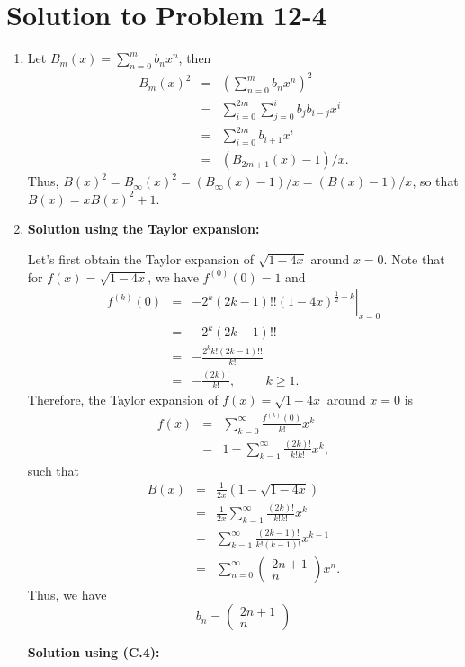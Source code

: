 \documentclass[a4paper, fleqn]{article}
\begin{document}
\section*{Solution to Problem 12-4}
\begin{enumerate}
\renewcommand{\labelenumi}{\itshape \bfseries \alph{enumi}.}

\item  %
Let $B_m(x) = \sum_{n=0}^mb_nx^n$, then
\begin{eqnarray*}
B_m(x)^2 & = & \left(\sum_{n=0}^mb_nx^n\right)^2 \\
        & = & \sum_{i=0}^{2m}\sum_{j=0}^ib_jb_{i-j}x^i \\
        & = & \sum_{i=0}^{2m}b_{i+1}x^i \\
        & = & (B_{2m+1}(x)-1)/x.
\end{eqnarray*}
Thus, $B(x)^2 = B_\infty(x)^2 = (B_\infty(x)-1)/x = (B(x)-1)/x$, so
that $B(x) = xB(x)^2+1$.

\item  %
\textbf{Solution using the Taylor expansion:}

Let's first obtain the Taylor expansion of $\sqrt{1-4x}$ around $x =
0$. Note that for $f(x) = \sqrt{1-4x}$, we have $f^{(0)}(0) = 1$ and
\begin{eqnarray*}
f^{(k)}(0) & = &
\left.-2^{k}(2k-1)!!(1-4x)^{\frac{1}{2}-k}\right|_{x=0} \\
& = & -2^{k}(2k-1)!! \\
& = & -\frac{2^kk!(2k-1)!!}{k!} \\
& = & -\frac{(2k)!}{k!}, \hspace{1cm} k \geq 1.
\end{eqnarray*}
Therefore, the Taylor expansion of $f(x) = \sqrt{1-4x}$ around $x = 0$
is
\begin{eqnarray*}
f(x) & = & \sum_{k=0}^\infty \frac{f^{(k)}(0)}{k!} x^k \\
     & = & 1 - \sum_{k=1}^\infty \frac{(2k)!}{k!k!} x^k,
\end{eqnarray*}
such that
\begin{eqnarray*}
B(x) & = & \frac{1}{2x}(1-\sqrt{1-4x}) \\
     & = & \frac{1}{2x} \sum_{k=1}^\infty \frac{(2k)!}{k!k!} x^k \\
     & = & \sum_{k=1}^\infty \frac{(2k-1)!}{k!(k-1)!} x^{k-1} \\
     & = & \sum_{n=0}^\infty \left(\!\!\!\begin{array}{c}2n+1
  \\ n\end{array}\!\!\!\right) x^n.
\end{eqnarray*}
Thus, we have
\[b_n = \left(\!\!\!\begin{array}{c}2n+1 \\ n\end{array}\!\!\!\right)\]

\textbf{Solution using (C.4):}
\end{enumerate}
\end{document}
